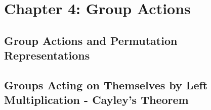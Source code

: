 \section{Chapter 4: Group Actions}

\subsection{Group Actions and Permutation Representations}

\subsection{Groups Acting on Themselves by Left Multiplication - Cayley's Theorem}










\newpage
